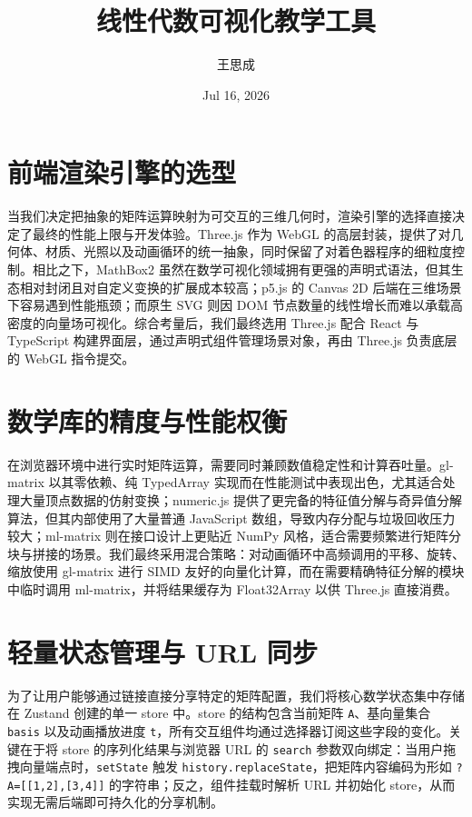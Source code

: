 \title{线性代数可视化教学工具}
\author{王思成}
\date{Jul 16, 2026}
\maketitle
\chapter{前端渲染引擎的选型}
当我们决定把抽象的矩阵运算映射为可交互的三维几何时，渲染引擎的选择直接决定了最终的性能上限与开发体验。Three.js 作为 WebGL 的高层封装，提供了对几何体、材质、光照以及动画循环的统一抽象，同时保留了对着色器程序的细粒度控制。相比之下，MathBox2 虽然在数学可视化领域拥有更强的声明式语法，但其生态相对封闭且对自定义变换的扩展成本较高；p5.js 的 Canvas 2D 后端在三维场景下容易遇到性能瓶颈；而原生 SVG 则因 DOM 节点数量的线性增长而难以承载高密度的向量场可视化。综合考量后，我们最终选用 Three.js 配合 React 与 TypeScript 构建界面层，通过声明式组件管理场景对象，再由 Three.js 负责底层的 WebGL 指令提交。\par
\chapter{数学库的精度与性能权衡}
在浏览器环境中进行实时矩阵运算，需要同时兼顾数值稳定性和计算吞吐量。gl-matrix 以其零依赖、纯 TypedArray 实现而在性能测试中表现出色，尤其适合处理大量顶点数据的仿射变换；numeric.js 提供了更完备的特征值分解与奇异值分解算法，但其内部使用了大量普通 JavaScript 数组，导致内存分配与垃圾回收压力较大；ml-matrix 则在接口设计上更贴近 NumPy 风格，适合需要频繁进行矩阵分块与拼接的场景。我们最终采用混合策略：对动画循环中高频调用的平移、旋转、缩放使用 gl-matrix 进行 SIMD 友好的向量化计算，而在需要精确特征分解的模块中临时调用 ml-matrix，并将结果缓存为 Float32Array 以供 Three.js 直接消费。\par
\chapter{轻量状态管理与 URL 同步}
为了让用户能够通过链接直接分享特定的矩阵配置，我们将核心数学状态集中存储在 Zustand 创建的单一 store 中。store 的结构包含当前矩阵 \texttt{A}、基向量集合 \texttt{basis} 以及动画播放进度 \texttt{t}，所有交互组件均通过选择器订阅这些字段的变化。关键在于将 store 的序列化结果与浏览器 URL 的 \texttt{search} 参数双向绑定：当用户拖拽向量端点时，\texttt{setState} 触发 \texttt{history.replaceState}，把矩阵内容编码为形如 \texttt{?A=[[1,2],[3,4]]} 的字符串；反之，组件挂载时解析 URL 并初始化 store，从而实现无需后端即可持久化的分享机制。\par
